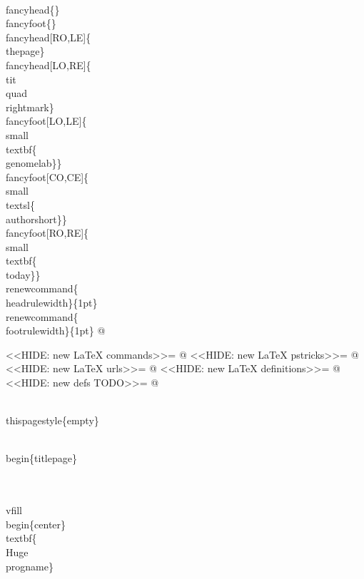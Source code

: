 \documentclass[11pt]{article}
\def\nwendcode{\endtrivlist \endgroup} %
\let\nwdocspar=\par                    %
\begin{document}
\\fancyhead\{\} %
\\fancyfoot\{\} %
\\fancyhead[RO,LE]\{\\thepage\}
\\fancyhead[LO,RE]\{\\tit\\quad\\rightmark\}
\\fancyfoot[LO,LE]\{\\small\\textbf\{\\genomelab\}\}
\\fancyfoot[CO,CE]\{\\small\\textsl\{\\authorshort\}\}
\\fancyfoot[RO,RE]\{\\small\\textbf\{\\today\}\}
\\renewcommand\{\\headrulewidth\}\{1pt\}
\\renewcommand\{\\footrulewidth\}\{1pt\}
%
@

<<HIDE: new LaTeX commands>>=
@ 
<<HIDE: new LaTeX pstricks>>=
@ 
<<HIDE: new LaTeX urls>>=
@ 
<<HIDE: new LaTeX definitions>>=
@ 
<<HIDE: new defs TODO>>=
@ 

\nwendcode{}\nwdocspar

\nwenddocs{}\endmoddef
\\thispagestyle\{empty\}

\\begin\{titlepage\}

\\ \\vfill
\\begin\{center\}
\\textbf\{\\Huge \\progname\}\\\\[5ex]
\end{document}
